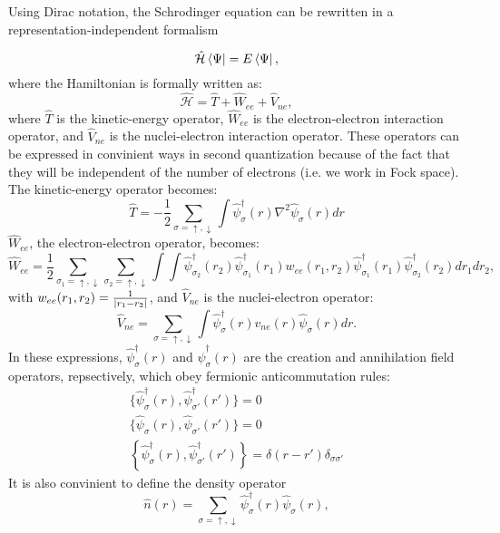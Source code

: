 Using Dirac notation, the Schrodinger equation can be rewritten in
a representation-independent formalism

\begin{equation}
  \hat{\mathcal{H}}\bra{\Psi}=E\bra{\Psi},
\end{equation}
where the Hamiltonian is formally written as:
\begin{equation}
  \hat{\mathcal{H}}=\hat{T}+\hat{W}_{ee}+\hat{V}_{ne},
\end{equation}
where $\hat{T}$ is the kinetic-energy operator, $\hat{W}_{ee}$ is the
electron-electron interaction operator, and $\hat{V}_{ne}$ is the
nuclei-electron interaction operator. These operators can be expressed in
convinient ways in second quantization because of the fact that they will be
independent of the number of electrons (i.e. we work in Fock space). The
kinetic-energy operator becomes:
\begin{equation}
  \hat{T}
  = - \frac{1}{2}\sum_{\sigma=\uparrow,\downarrow}\int{\hat{\psi}^\dagger_\sigma(r)\nabla^2\hat{\psi}_\sigma(r)dr}
\end{equation}
$\hat{W}_{ee}$, the electron-electron operator, becomes:
\begin{equation}
  \hat{W}_{ee}
  = \frac{1}{2}\sum_{\sigma_1=\uparrow,\downarrow}\sum_{\sigma_2=\uparrow,\downarrow}\int\int\hat{\psi}^\dagger_{\sigma_2}(r_2)\hat{\psi}^\dagger_{\sigma_1}(r_1)w_{ee}(r_1,r_2)\hat{\psi}^\dagger_{\sigma_1}(r_1)\hat{\psi}^\dagger_{\sigma_2}(r_2)dr_1dr_2,
\end{equation}
with $w_{ee}(r_1,r_2) = \frac{1}{\abs{r_1-r_2}}$, and $\hat{V}_{ne}$ is the
nuclei-electron operator:
\begin{equation}
  \hat{V}_{ne}
  = \sum_{\sigma=\uparrow,\downarrow}\int\hat{\psi}^\dagger_\sigma(r)v_{ne}(r)\hat{\psi}_{\sigma}(r)dr.
\end{equation}
In these expressions, $\hat{\psi}^\dagger_\sigma(r)$ and
$\hat{\psi}^\dagger_\sigma(r)$ are the creation and annihilation field
operators, repsectively, which obey fermionic anticommutation rules:
\begin{gather}
  \{\hat{\psi}^\dagger_\sigma(r),\hat{\psi}^\dagger_{\sigma '}(r')\}=0\\
\{\hat{\psi}_\sigma(r),\hat{\psi}_{\sigma '}(r')\} = 0\\
\left\{\hat{\psi}^\dagger_\sigma(r),\hat{\psi}^\dagger_{\sigma'}(r')\right\}
= \delta(r-r')\delta_{\sigma\sigma'}
\end{gather}
It is also convinient to define the density operator
\begin{equation}
  \hat{n}(r)
  = \sum_{\sigma=\uparrow,\downarrow}\hat{\psi}^\dagger_\sigma(r)\hat{\psi}_\sigma(r),
\end{equation}
